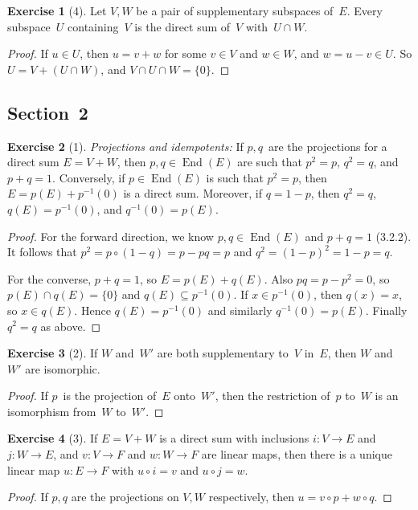 \documentclass[letterpaper,12pt]{article}
\newcommand{\sect}{\cap}
\newcommand{\after}{\circ}
\DeclareMathOperator{\End}{End}
\newcommand{\inv}[1]{#1^{-1}}
\newcommand{\kerz}[1]{\inv{#1}(0)}
\theoremstyle{definition}
\newtheorem*{exer}{Exercise}
\theoremstyle{remark}
\begin{document}
\begin{exer}[4]
Let \(V,W\) be a pair of supplementary subspaces of~\(E\). Every subspace~\(U\) containing~\(V\) is the direct sum of~\(V\) with~\(U\sect W\).
\end{exer}
\begin{proof}
If \(u\in U\), then \(u=v+w\) for some \(v\in V\) and \(w\in W\), and \(w=u-v\in U\). So \(U=V+(U\sect W)\), and \(V\sect U\sect W=\{0\}\).
\end{proof}

\subsection*{Section~2}
\begin{exer}[1]
\emph{Projections and idempotents:} If \(p,q\)~are the projections for a direct sum \(E=V+W\), then \(p,q\in\End(E)\) are such that \(p^2=p\), \(q^2=q\), and \(p+q=1\). Conversely, if \(p\in\End(E)\) is such that \(p^2=p\), then \(E=p(E)+\kerz{p}\) is a direct sum. Moreover, if \(q=1-p\), then \(q^2=q\), \(q(E)=\kerz{p}\), and \(\kerz{q}=p(E)\).
\end{exer}
\begin{proof}
For the forward direction, we know \(p,q\in\End(E)\) and \(p+q=1\) (3.2.2). It follows that \(p^2=p\after(1-q)=p-pq=p\) and \(q^2=(1-p)^2=1-p=q\).

For the converse, \(p+q=1\), so \(E=p(E)+q(E)\). Also \(pq=p-p^2=0\), so \(p(E)\sect q(E)=\{0\}\) and \(q(E)\subseteq\kerz{p}\). If \(x\in\kerz{p}\), then \(q(x)=x\), so \(x\in q(E)\). Hence \(q(E)=\kerz{p}\) and similarly \(\kerz{q}=p(E)\). Finally \(q^2=q\) as above.
\end{proof}

\begin{exer}[2]
If \(W\) and~\(W'\) are both supplementary to~\(V\) in~\(E\), then \(W\) and~\(W'\) are isomorphic.
\end{exer}
\begin{proof}
If \(p\)~is the projection of~\(E\) onto~\(W'\), then the restriction of~\(p\) to~\(W\) is an isomorphism from~\(W\) to~\(W'\).
\end{proof}

\begin{exer}[3]
If \(E=V+W\) is a direct sum with inclusions \(i:V\to E\) and \(j:W\to E\), and \(v:V\to F\) and \(w:W\to F\) are linear maps, then there is a unique linear map \(u:E\to F\) with \(u\after i=v\) and \(u\after j=w\).
\end{exer}
\begin{proof}
If \(p,q\) are the projections on \(V,W\) respectively, then \(u=v\after p+w\after q\).
\end{proof}
\end{document}
